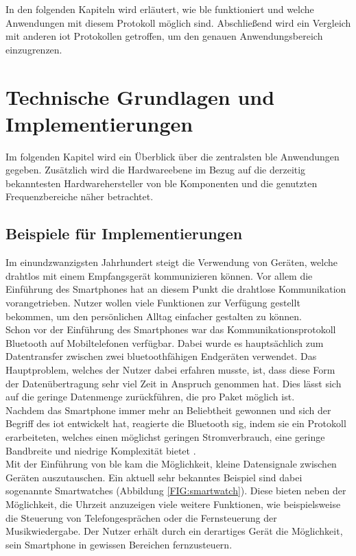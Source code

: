 \noindent In den folgenden Kapiteln wird erläutert, wie \ac{ble} funktioniert und welche Anwendungen mit diesem Protokoll möglich sind. Abschließend wird ein Vergleich mit anderen \ac{iot} Protokollen getroffen, um den genauen Anwendungsbereich einzugrenzen.\\   

\section{Technische Grundlagen und Implementierungen}
\label{s:grundlagen}

Im folgenden Kapitel wird ein Überblick über die zentralsten \ac{ble} Anwendungen gegeben. Zusätzlich wird die Hardwareebene im Bezug auf die derzeitig bekanntesten Hardwarehersteller von \ac{ble} Komponenten und die genutzten Frequenzbereiche näher betrachtet. 

\subsection{Beispiele für Implementierungen}
\label{ss:grundlagen:beispiele}

Im einundzwanzigsten Jahrhundert steigt die Verwendung von Geräten, welche drahtlos mit einem Empfangsgerät kommunizieren können. Vor allem die Einführung des Smartphones hat an diesem Punkt die drahtlose Kommunikation vorangetrieben. Nutzer wollen viele Funktionen zur Verfügung gestellt bekommen, um den persönlichen Alltag einfacher gestalten zu können.\\

\noindent Schon vor der Einführung des Smartphones war das Kommunikationsprotokoll Bluetooth auf Mobiltelefonen verfügbar. Dabei wurde es hauptsächlich zum Datentransfer zwischen zwei bluetoothfähigen Endgeräten verwendet. Das Hauptproblem, welches der Nutzer dabei erfahren musste, ist, dass diese Form der Datenübertragung sehr viel Zeit in Anspruch genommen hat. Dies lässt sich auf die geringe Datenmenge zurückführen, die pro Paket möglich ist.\\

\noindent Nachdem das Smartphone immer mehr an Beliebtheit gewonnen und sich der Begriff des \ac{iot} entwickelt hat, reagierte die Bluetooth \ac{sig}, indem sie ein Protokoll erarbeiteten, welches einen möglichst geringen Stromverbrauch, eine geringe Bandbreite und niedrige Komplexität bietet \cite[Seite 1]{Townsend14:GSB}.\\

\noindent Mit der Einführung von \ac{ble} kam die Möglichkeit, kleine Datensignale zwischen Geräten auszutauschen. Ein aktuell sehr bekanntes Beispiel sind dabei sogenannte Smartwatches (Abbildung \ref{FIG:smartwatch}). Diese bieten neben der Möglichkeit, die Uhrzeit anzuzeigen viele weitere Funktionen, wie beispielsweise die Steuerung von Telefongesprächen oder die Fernsteuerung der Musikwiedergabe. Der Nutzer erhält durch ein derartiges Gerät die Möglichkeit, sein Smartphone in gewissen Bereichen fernzusteuern.\\

